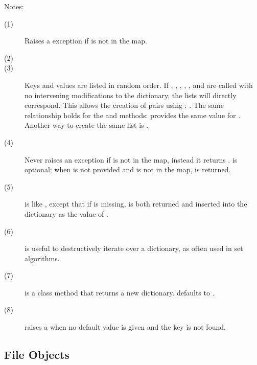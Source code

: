 \noindent
Notes:
\begin{description}
\item[(1)] Raises a  exception if  is not
in the map.

\item[(2)] 

\item[(3)] Keys and values are listed in random order.  If
, , ,
, , and 
are called with no intervening modifications to the dictionary, the
lists will directly correspond.  This allows the creation of
 pairs using :
.  The same
relationship holds for the  and
 methods:  provides the same value for .
Another way to create the same list is .

\item[(4)] Never raises an exception if  is not in the map,
instead it returns .   is optional; when  is not
provided and  is not in the map,  is returned.

\item[(5)]  is like , except
that if  is missing,  is both returned and inserted into
the dictionary as the value of .

\item[(6)]  is useful to destructively iterate
over a dictionary, as often used in set algorithms.

\item[(7)]  is a class method that returns a
new dictionary.  defaults to .  

\item[(8)]  raises a  when no default
value is given and the key is not found.  
\end{description}


\subsection{File Objects
            \label{bltin-file-objects}}

